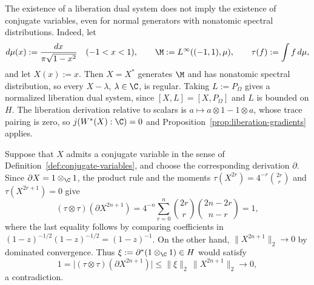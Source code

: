 \begin{remark}\label{rem:liberation-without-conjugates}
The existence of a liberation dual system does not imply the existence of conjugate variables, even for normal generators with nonatomic spectral distributions.
Indeed, let
\[
 d\mu(x):=\frac{dx}{\pi\sqrt{1-x^2}}\quad(-1<x<1),\qquad
 \M:=L^\infty((-1,1),\mu),\qquad \tau(f):=\int f\,d\mu,
\]
and let $X(x):=x$.
Then $X=X^*$ generates $\M$ and has nonatomic spectral distribution, so every $X-\lambda$, $\lambda\in\C$, is regular.
Taking $L:=P_\Omega$ gives a normalized liberation dual system, since $[X,L]=[X,P_\Omega]$ and $L$ is bounded on $H$.
The liberation derivation relative to scalars is $a\mapsto a\otimes1-1\otimes a$, whose trace pairing is zero, so $j(W^*(X):\C)=0$ and Proposition~\ref{prop:liberation-gradients} applies.

Suppose that $X$ admits a conjugate variable in the sense of Definition~\ref{def:conjugate-variables}, and choose the corresponding derivation $\partial$.
Since $\partial X=1\otimes_{\C}1$, the product rule and the moments $\tau(X^{2r})=4^{-r}\binom{2r}{r}$ and $\tau(X^{2r+1})=0$ give
\[
 (\tau\otimes\tau)(\partial X^{2n+1})
 =4^{-n}\sum_{r=0}^{n}\binom{2r}{r}\binom{2n-2r}{n-r}=1,
\]
where the last equality follows by comparing coefficients in $(1-z)^{-1/2}(1-z)^{-1/2}=(1-z)^{-1}$.
On the other hand, $\|X^{2n+1}\|_2\to0$ by dominated convergence.
Thus $\xi:=\partial^*(1\otimes_{\C}1)\in H$ would satisfy
\[
 1=\bigl|(\tau\otimes\tau)(\partial X^{2n+1})\bigr|
 \leq\|\xi\|_2\,\|X^{2n+1}\|_2\longrightarrow0,
\]
a contradiction.
\end{remark}
